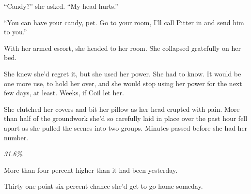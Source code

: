 ``Candy?'' she asked.  ``My head hurts.''



``You can have your candy, pet.  Go to your room, I'll call Pitter in and send him to you.''



With her armed escort, she headed to her room.  She collapsed gratefully on her bed.



She knew she'd regret it, but she used her power.  She had to know.  It would be one more use, to hold her over, and she would stop using her power for the next few days, at least.  Weeks, if Coil let her.



She clutched her covers and bit her pillow as her head erupted with pain.  More than half of the groundwork she'd so carefully laid in place over the past hour fell apart as she pulled the scenes into two groups.  Minutes passed before she had her number.



\emph{31.6\%}.



More than four percent higher than it had been yesterday.



Thirty-one point six percent chance she'd get to go home someday.





